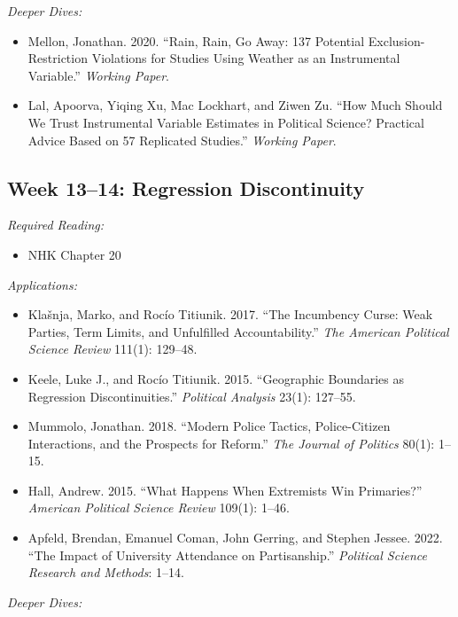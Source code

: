 \documentclass[11pt, letterpaper]{article}
\begin{document}
\noindent \textit{Deeper Dives:}

\begin{itemize}
	\item Mellon, Jonathan. 2020. ``Rain, Rain, Go Away: 137 Potential Exclusion-Restriction Violations for Studies Using Weather as an Instrumental Variable.'' \textit{Working Paper}.
	\item Lal, Apoorva, Yiqing Xu, Mac Lockhart, and Ziwen Zu. ``How Much Should We Trust Instrumental Variable Estimates in Political Science? Practical Advice Based on 57 Replicated Studies.'' \textit{Working Paper}.
\end{itemize}


\subsection*{Week 13--14: Regression Discontinuity}

\textit{Required Reading:}

\begin{itemize}
	\item NHK Chapter 20
\end{itemize}


\noindent \textit{Applications:}

\begin{itemize}
	\item Klašnja, Marko, and Rocío Titiunik. 2017. ``The Incumbency Curse: Weak Parties, Term Limits, and Unfulfilled Accountability.'' \textit{The American Political Science Review} 111(1): 129–48.
	\item Keele, Luke J., and Rocío Titiunik. 2015. ``Geographic Boundaries as Regression Discontinuities.'' \textit{Political Analysis} 23(1): 127–55.
	\item Mummolo, Jonathan. 2018. ``Modern Police Tactics, Police-Citizen Interactions, and the Prospects for Reform.'' \textit{The Journal of Politics} 80(1): 1–15.
	\item Hall, Andrew. 2015. ``What Happens When Extremists Win Primaries?'' \textit{American Political Science Review} 109(1): 1–46.
	\item Apfeld, Brendan, Emanuel Coman, John Gerring, and Stephen Jessee. 2022. ``The Impact of University Attendance on Partisanship.'' \textit{Political Science Research and Methods}: 1–14.
\end{itemize}

\noindent \textit{Deeper Dives:}
\end{document}

